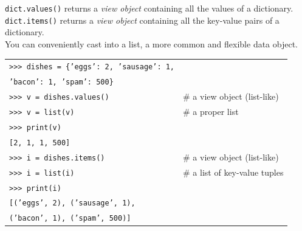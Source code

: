 \documentclass[t,handout,9pt]{beamer}
\begin{document}
\begin{frame}
\vfill
\texttt{dict.values()} returns a \textit{view object} containing all the values of a dictionary.\\
\texttt{dict.items()} returns a \textit{view object} containing all the key-value pairs of a dictionary.\\
You can conveniently cast into a list, a more common and flexible data object.
\begin{table}[]
\begin{flushleft}
\begin{tabular}{ll}
\texttt{>{}>{}> dishes = \{'eggs': 2, 'sausage': 1,} &   \\
\texttt{\qquad 'bacon': 1, 'spam': 500\}} &   \\
\texttt{>{}>{}> v = dishes.values()} &   \# a view object (list-like) \\
\texttt{>{}>{}> v = list(v)} &   \# a proper list \\
\texttt{>{}>{}> print(v)} &   \\
\texttt{[2, 1, 1, 500]} &   \\
\texttt{>{}>{}> i = dishes.items()} &   \# a view object (list-like) \\
\texttt{>{}>{}> i = list(i)} &   \# a list of key-value tuples \\
\texttt{>{}>{}> print(i)} &   \\
\texttt{[('eggs', 2), ('sausage', 1),} &   \\
\texttt{\qquad ('bacon', 1), ('spam', 500)]} &   \\
\end{tabular}
\end{flushleft}
\end{table}
\vfill
\end{frame}
%
\end{document}
